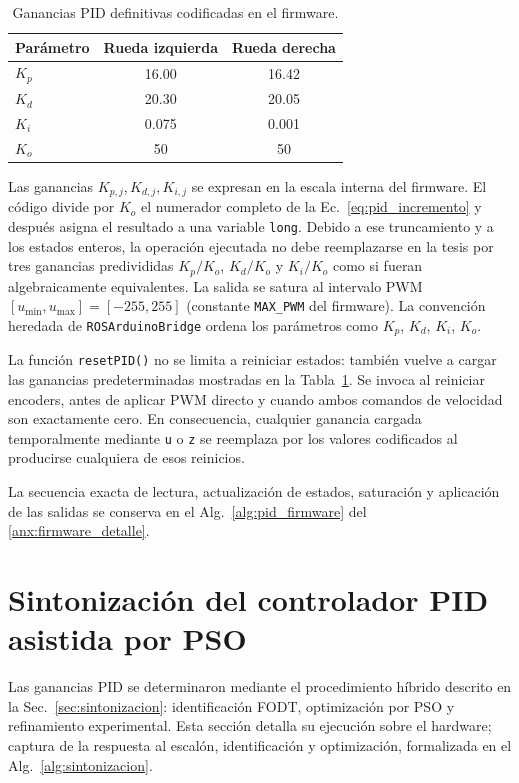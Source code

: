 \begin{table}[H]
\centering
\caption{Ganancias PID definitivas codificadas en el firmware.}
\label{tab:ganancias_pid}
\small
\begin{tabular}{lcc}
\toprule
\textbf{Parámetro} & \textbf{Rueda izquierda} & \textbf{Rueda derecha} \\
\midrule
$K_p$ & 16.00 & 16.42 \\
$K_d$ & 20.30 & 20.05 \\
$K_i$ & 0.075 & 0.001 \\
$K_o$ & 50 & 50 \\
\bottomrule
\end{tabular}
\end{table}

Las ganancias $K_{p,j},K_{d,j},K_{i,j}$ se expresan en la escala interna del firmware. El código divide por $K_o$ el numerador completo de la Ec.~\ref{eq:pid_incremento} y después asigna el resultado a una variable \texttt{long}. Debido a ese truncamiento y a los estados enteros, la operación ejecutada no debe reemplazarse en la tesis por tres ganancias predivididas $K_p/K_o$, $K_d/K_o$ y $K_i/K_o$ como si fueran algebraicamente equivalentes. La salida se satura al intervalo PWM $[u_{\min},u_{\max}]=[-255,255]$ (constante \texttt{MAX\_PWM} del firmware). La convención heredada de \texttt{ROSArduinoBridge} ordena los parámetros como $K_p$, $K_d$, $K_i$, $K_o$.

La función \texttt{resetPID()} no se limita a reiniciar estados: también vuelve a cargar las ganancias predeterminadas mostradas en la Tabla~\ref{tab:ganancias_pid}. Se invoca al reiniciar encoders, antes de aplicar PWM directo y cuando ambos comandos de velocidad son exactamente cero. En consecuencia, cualquier ganancia cargada temporalmente mediante \texttt{u} o \texttt{z} se reemplaza por los valores codificados al producirse cualquiera de esos reinicios.

La secuencia exacta de lectura, actualización de estados, saturación y
aplicación de las salidas se conserva en el Alg.~\ref{alg:pid_firmware} del
\ref{anx:firmware_detalle}.

\section{Sintonización del controlador PID asistida por PSO}
\label{sec:sintonizacion_pso}

Las ganancias PID se determinaron mediante el procedimiento híbrido descrito en la Sec.~\ref{sec:sintonizacion}: identificación FODT, optimización por PSO y refinamiento experimental. Esta sección detalla su ejecución sobre el hardware; captura de la respuesta al escalón, identificación y optimización, formalizada en el Alg.~\ref{alg:sintonizacion}.

